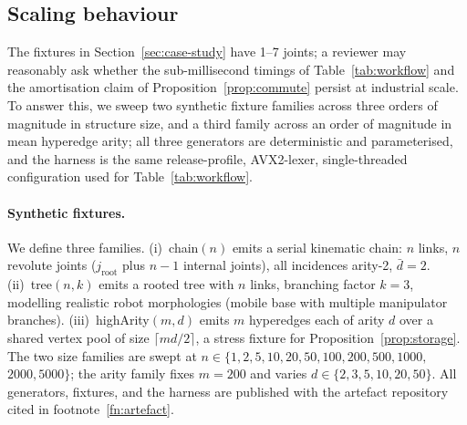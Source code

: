 
\subsection{Scaling behaviour}
\label{sec:scaling}

The fixtures in Section~\ref{sec:case-study} have 1--7 joints; a
reviewer may reasonably ask whether the sub-millisecond timings of
Table~\ref{tab:workflow} and the amortisation claim of
Proposition~\ref{prop:commute} persist at industrial scale. To answer
this, we sweep two synthetic fixture families across three orders of
magnitude in structure size, and a third family across an order of
magnitude in mean hyperedge arity; all three generators are deterministic
and parameterised, and the harness is the same release-profile,
AVX2-lexer, single-threaded configuration used for Table~\ref{tab:workflow}.

\paragraph{Synthetic fixtures.}
We define three families. (i)~\textsf{chain}$(n)$ emits a serial
kinematic chain: $n$ links, $n$ revolute joints ($j_{\mathrm{root}}$ plus
$n-1$ internal joints), all incidences arity-2, $\bar{d} = 2$. (ii)~\textsf{tree}$(n, k)$
emits a rooted tree with $n$ links, branching factor $k{=}3$, modelling
realistic robot morphologies (mobile base with multiple manipulator
branches). (iii)~\textsf{highArity}$(m, d)$ emits $m$ hyperedges each of
arity $d$ over a shared vertex pool of size $\lceil md/2 \rceil$, a
stress fixture for Proposition~\ref{prop:storage}. The two size families
are swept at $n \in \{1, 2, 5, 10, 20, 50, 100, 200, 500, 1000,$
$2000, 5000\}$; the arity family fixes $m{=}200$ and varies
$d \in \{2, 3, 5, 10, 20, 50\}$. All generators, fixtures, and the
harness are published with the artefact repository cited in
footnote~\ref{fn:artefact}.


